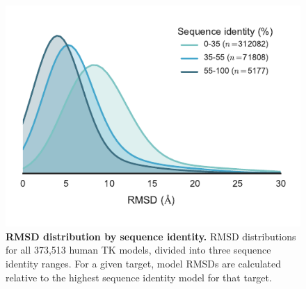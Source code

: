 \documentclass[aps,pre,twocolumn,nofootinbib,superscriptaddress,linenumbers]{revtex4-1}
\begin{document}
\begin{figure}[tb]
  \centering
    \includegraphics[width=1.0\textwidth]{rmsddist/rmsddist2}
    \caption{{\bf RMSD distribution by sequence identity.}
    RMSD distributions for all 373,513 human TK models, divided into three sequence identity ranges.
    For a given target, model RMSDs are calculated relative to the highest sequence identity model for that target.
  }
  \label{figrmsddist}
\end{figure}
\end{document}
